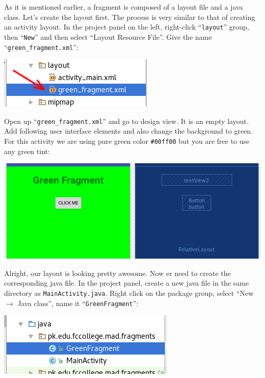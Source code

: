 As it is mentioned earlier, a fragment is composed of a layout file and a java class. Let's create the layout first. The process is very similar to that of creating an activity layout. In the project panel on the left, right-click ``\texttt{layout}'' group, then ``\texttt{New}'' and then select ``Layout Resource File''. Give the name ``\texttt{green\_fragment.xml}'':

\begin{center}
	\includegraphics[scale=\SourceCodeScale]{chapters/ch11/images/2}
\end{center}

Open up ``\texttt{green\_fragment.xml}'' and go to design view. It is an empty layout. Add following user interface elements and also change the background to green. For this activity we are using pure green color \texttt{\#00ff00} but you are free to use any green tint:

\begin{center}
	\includegraphics[scale=\FigureScale]{chapters/ch11/images/3}
\end{center}

Alright, our layout is looking pretty awesome. Now er need to create the corresponding java file. In the project panel, create a new java file in the same directory as \texttt{MainActivity.java}. Right click on the package group, select ``New $\rightarrow$ Java class'', name it ``\texttt{GreenFragment}'':

\begin{center}
	\includegraphics[scale=\SourceCodeScale]{chapters/ch11/images/4}
\end{center}

